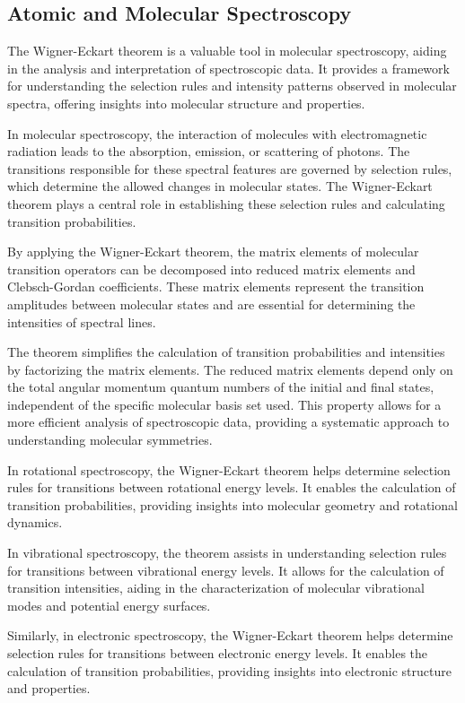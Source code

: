 \documentclass[a4paper,11pt]{article}
\begin{document}
\subsection{Atomic and Molecular Spectroscopy}

The Wigner-Eckart theorem is a valuable tool in molecular spectroscopy, aiding in the analysis and interpretation of spectroscopic data. It provides a framework for understanding the selection rules and intensity patterns observed in molecular spectra, offering insights into molecular structure and properties.

In molecular spectroscopy, the interaction of molecules with electromagnetic radiation leads to the absorption, emission, or scattering of photons. The transitions responsible for these spectral features are governed by selection rules, which determine the allowed changes in molecular states. The Wigner-Eckart theorem plays a central role in establishing these selection rules and calculating transition probabilities.

By applying the Wigner-Eckart theorem, the matrix elements of molecular transition operators can be decomposed into reduced matrix elements and Clebsch-Gordan coefficients. These matrix elements represent the transition amplitudes between molecular states and are essential for determining the intensities of spectral lines.

The theorem simplifies the calculation of transition probabilities and intensities by factorizing the matrix elements. The reduced matrix elements depend only on the total angular momentum quantum numbers of the initial and final states, independent of the specific molecular basis set used. This property allows for a more efficient analysis of spectroscopic data, providing a systematic approach to understanding molecular symmetries.

In rotational spectroscopy, the Wigner-Eckart theorem helps determine selection rules for transitions between rotational energy levels. It enables the calculation of transition probabilities, providing insights into molecular geometry and rotational dynamics.

In vibrational spectroscopy, the theorem assists in understanding selection rules for transitions between vibrational energy levels. It allows for the calculation of transition intensities, aiding in the characterization of molecular vibrational modes and potential energy surfaces.

Similarly, in electronic spectroscopy, the Wigner-Eckart theorem helps determine selection rules for transitions between electronic energy levels. It enables the calculation of transition probabilities, providing insights into electronic structure and properties.
\end{document}
